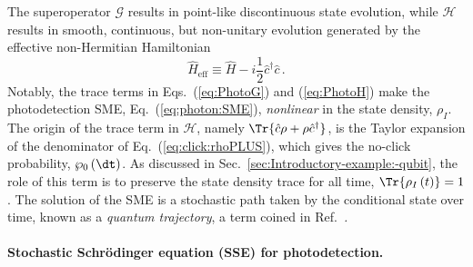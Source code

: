 The superoperator $\mathcal{G}$ results in point-like discontinuous
state evolution, while $\mathcal{H}$ results in smooth, continuous,
but non-unitary evolution generated by the effective non-Hermitian
Hamiltonian 
\begin{equation}
\hat{H}_{\text{eff}}\equiv\hat{H}-i\frac{1}{2}\hat{c}^{\dagger}\hat{c}\,.\label{eq:H_eff_noclick}
\end{equation}
Notably, the trace terms in Eqs.~(\ref{eq:PhotoG}) and (\ref{eq:PhotoH})
make the photodetection SME, Eq.~(\ref{eq:photon:SME}), \emph{nonlinear}
in the state density, $\rho_{I}$. The origin of the trace term in
$\mathcal{H}$, namely $\Tr{\hat{c}\rho+\rho\hat{c}^{\dagger}}$,
is the Taylor expansion of the denominator of Eq.~(\ref{eq:click:rhoPLUS}),
which gives the no-click probability, $\wp_{0}\left(\dt\right)$.
As discussed in Sec.~\ref{sec:Introductory-example:-qubit}, the
role of this term is to preserve the state density trace for all time,
$\Tr{\rho_{I}\left(t\right)}=1$. The solution of the SME is a stochastic
path taken by the conditional state over time, known as a \emph{quantum
trajectory}, a term\emph{ }coined in Ref.\emph{~\citet{Carmichael1993}. }

\paragraph{Stochastic Schrödinger equation (SSE) for photodetection. }

